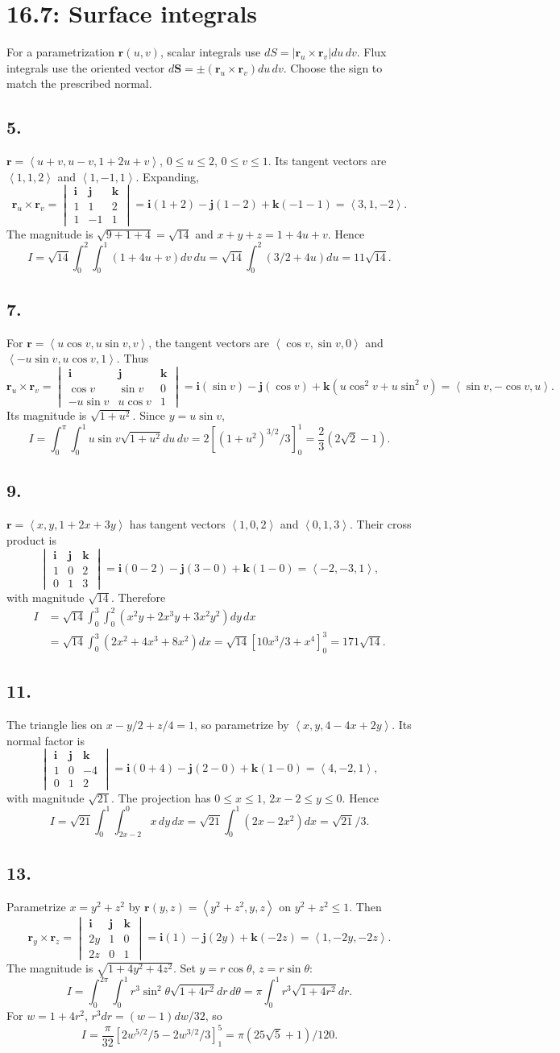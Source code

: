 \documentclass[11pt]{article}
\newcommand{\ex}[1]{\subsection*{#1.}}
\newcommand{\ans}[1]{\boxed{#1}}
\newcommand{\vv}[1]{\left\langle #1\right\rangle}
\newcommand{\ii}{\mathbf i}\newcommand{\jj}{\mathbf j}\newcommand{\kk}{\mathbf k}
\newcommand{\cp}[6]{\begin{vmatrix}\ii&\jj&\kk\\#1&#2&#3\\#4&#5&#6\end{vmatrix}}
\begin{document}
\clearpage\section*{16.7: Surface integrals}
For a parametrization $\mathbf r(u,v)$, scalar integrals use $dS=|\mathbf r_u\times\mathbf r_v|du\,dv$. Flux integrals use the oriented vector $d\mathbf S=\pm(\mathbf r_u\times\mathbf r_v)du\,dv$. Choose the sign to match the prescribed normal.
\ex{5}
$\mathbf r=\vv{u+v,u-v,1+2u+v}$, $0\le u\le2$, $0\le v\le1$. Its tangent vectors are $\vv{1,1,2}$ and $\vv{1,-1,1}$. Expanding,
\[\mathbf r_u\times\mathbf r_v=\cp{1}{1}{2}{1}{-1}{1}
=\ii(1+2)-\jj(1-2)+\kk(-1-1)=\vv{3,1,-2}.\]
The magnitude is $\sqrt{9+1+4}=\sqrt{14}$ and $x+y+z=1+4u+v$. Hence
\[I=\sqrt{14}\int_0^2\int_0^1(1+4u+v)dv\,du
=\sqrt{14}\int_0^2(3/2+4u)du=\ans{11\sqrt{14}}.\]
\ex{7}
For $\mathbf r=\vv{u\cos v,u\sin v,v}$, the tangent vectors are $\vv{\cos v,\sin v,0}$ and $\vv{-u\sin v,u\cos v,1}$. Thus
\[\mathbf r_u\times\mathbf r_v=\cp{\cos v}{\sin v}{0}{-u\sin v}{u\cos v}{1}
=\ii(\sin v)-\jj(\cos v)+\kk(u\cos^2v+u\sin^2v)=\vv{\sin v,-\cos v,u}.\]
Its magnitude is $\sqrt{1+u^2}$. Since $y=u\sin v$,
\[I=\int_0^\pi\int_0^1u\sin v\sqrt{1+u^2}du\,dv
=2[(1+u^2)^{3/2}/3]_0^1=\ans{\frac23(2\sqrt2-1)}.\]
\ex{9}
$\mathbf r=\vv{x,y,1+2x+3y}$ has tangent vectors $\vv{1,0,2}$ and $\vv{0,1,3}$. Their cross product is
\[\cp{1}{0}{2}{0}{1}{3}=\ii(0-2)-\jj(3-0)+\kk(1-0)=\vv{-2,-3,1},\]
with magnitude $\sqrt{14}$. Therefore
\begin{align*}
I&=\sqrt{14}\int_0^3\int_0^2(x^2y+2x^3y+3x^2y^2)dy\,dx\\
&=\sqrt{14}\int_0^3(2x^2+4x^3+8x^2)dx
=\sqrt{14}[10x^3/3+x^4]_0^3=\ans{171\sqrt{14}}.
\end{align*}
\ex{11}
The triangle lies on $x-y/2+z/4=1$, so parametrize by $\vv{x,y,4-4x+2y}$. Its normal factor is
\[\cp{1}{0}{-4}{0}{1}{2}=\ii(0+4)-\jj(2-0)+\kk(1-0)=\vv{4,-2,1},\]
with magnitude $\sqrt{21}$. The projection has $0\le x\le1$, $2x-2\le y\le0$. Hence
\[I=\sqrt{21}\int_0^1\int_{2x-2}^0x\,dy\,dx
=\sqrt{21}\int_0^1(2x-2x^2)dx=\ans{\sqrt{21}/3}.\]
\ex{13}
Parametrize $x=y^2+z^2$ by $\mathbf r(y,z)=\vv{y^2+z^2,y,z}$ on $y^2+z^2\le1$. Then
\[\mathbf r_y\times\mathbf r_z=\cp{2y}{1}{0}{2z}{0}{1}
=\ii(1)-\jj(2y)+\kk(-2z)=\vv{1,-2y,-2z}.\]
The magnitude is $\sqrt{1+4y^2+4z^2}$. Set $y=r\cos\theta$, $z=r\sin\theta$:
\[I=\int_0^{2\pi}\int_0^1r^3\sin^2\theta\sqrt{1+4r^2}dr\,d\theta
=\pi\int_0^1r^3\sqrt{1+4r^2}dr.\]
For $w=1+4r^2$, $r^3dr=(w-1)dw/32$, so
\[I=\frac\pi{32}[2w^{5/2}/5-2w^{3/2}/3]_1^5=\ans{\pi(25\sqrt5+1)/120}.\]
\end{document}
